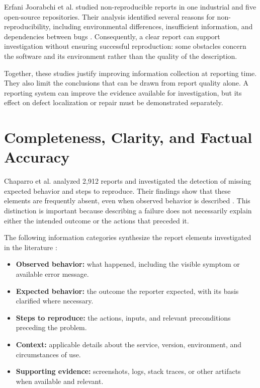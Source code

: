 Erfani Joorabchi et al. studied non-reproducible reports in one industrial and five open-source repositories. Their analysis identified several reasons for non-reproducibility, including environmental differences, insufficient information, and dependencies between bugs \cite{joorabchi2014}. Consequently, a clear report can support investigation without ensuring successful reproduction: some obstacles concern the software and its environment rather than the quality of the description.

Together, these studies justify improving information collection at reporting time. They also limit the conclusions that can be drawn from report quality alone. A reporting system can improve the evidence available for investigation, but its effect on defect localization or repair must be demonstrated separately.

\section{Completeness, Clarity, and Factual Accuracy}

Chaparro et al. analyzed 2,912 reports and investigated the detection of missing expected behavior and steps to reproduce. Their findings show that these elements are frequently absent, even when observed behavior is described \cite{chaparro2017}. This distinction is important because describing a failure does not necessarily explain either the intended outcome or the actions that preceded it.

The following information categories synthesize the report elements investigated in the literature \cite{zimmermann2010,chaparro2017,soltani2020,wang2025}:

\begin{itemize}
    \item \textbf{Observed behavior:} what happened, including the visible symptom or available error message.
    \item \textbf{Expected behavior:} the outcome the reporter expected, with its basis clarified where necessary.
    \item \textbf{Steps to reproduce:} the actions, inputs, and relevant preconditions preceding the problem.
    \item \textbf{Context:} applicable details about the service, version, environment, and circumstances of use.
    \item \textbf{Supporting evidence:} screenshots, logs, stack traces, or other artifacts when available and relevant.
\end{itemize}

